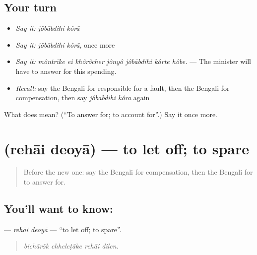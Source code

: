 \subsection*{Your turn}
\begin{itemize}
\raggedright
  \item \emph{Say it:} \emph{jôbābdihi kôrā}
  \item \emph{Say it:} \emph{jôbābdihi kôrā}, once more
  \item \emph{Say it:} \emph{môntrīke ei khôrôcher jônyô jôbābdihi kôrte hôbe.} — The minister will have to answer for this spending.
  \item \emph{Recall:} say the Bengali for responsible for a fault, then the Bengali for compensation, then say \emph{jôbābdihi kôrā} again
\end{itemize}

\begin{tcolorbox}[breakable,colback=teal!4,colframe=teal!35!black,title={Before you move on}]
What does   mean? (\textquotedblleft{}To answer for; to account for\textquotedblright{}.) Say it once more.
\end{tcolorbox}
\section[\texorpdfstring{\bn{রেহাই} \bn{দেওয়া} (rehāi deoyā)}{রেহাই দেওয়া (rehāi deoyā)}]{  (rehāi deoyā) — to let off; to spare}

\label{lesson:BN-C343-rehai-deoya}



\begin{quote}
Before the new one: say the Bengali for compensation, then the Bengali for to answer for.
\end{quote}

\subsection*{You'll want to know:  }
\textbf{ } — \emph{rehāi deoyā} — \textquotedblleft{}to let off; to spare\textquotedblright{}.

\begin{quote}
   
\end{quote}

\begin{quote}
\emph{bichārôk chheleṭāke rehāi dilen.}
\end{quote}

